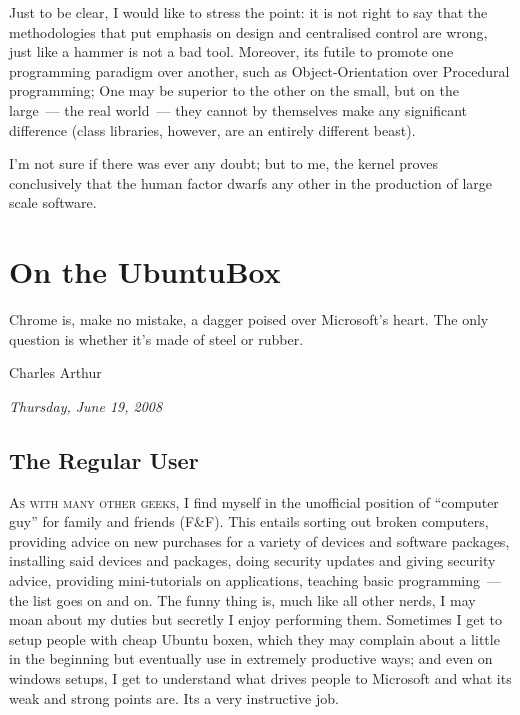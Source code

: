 \documentclass{book}
\begin{document}
Just to be clear, I would like to stress the point: it is not right to
say that the methodologies that put emphasis on design and centralised
control are wrong, just like a hammer is not a bad tool. Moreover, its
futile to promote one programming paradigm over another, such as
Object-Orientation over Procedural programming; One may be superior to
the other on the small, but on the large~--- the real world~--- they
cannot by themselves make any significant difference (class libraries,
however, are an entirely different beast).

I'm not sure if there was ever any doubt; but to me, the kernel proves
conclusively that the human factor dwarfs any other in the production
of large scale software.

\chapter{On the UbuntuBox}

\epigraph{Chrome is, make no mistake, a dagger poised over Microsoft's
  heart. The only question is whether it's made of steel or rubber.}{Charles Arthur}

\begin{flushright}
  \emph{Thursday, June 19, 2008}
\end{flushright}

\section{The Regular User}

\lettrine{A}{s with many other geeks}, I find myself in the unofficial
position of ``computer guy'' for family and friends (F\&F). This
entails sorting out broken computers, providing advice on new
purchases for a variety of devices and software packages, installing
said devices and packages, doing security updates and giving security
advice, providing mini-tutorials on applications, teaching basic
programming~--- the list goes on and on. The funny thing is, much like
all other nerds, I may moan about my duties but secretly I enjoy
performing them. Sometimes I get to setup people with cheap Ubuntu
boxen, which they may complain about a little in the beginning but
eventually use in extremely productive ways; and even on windows
setups, I get to understand what drives people to Microsoft and what
its weak and strong points are. Its a very instructive job.
\end{document}
